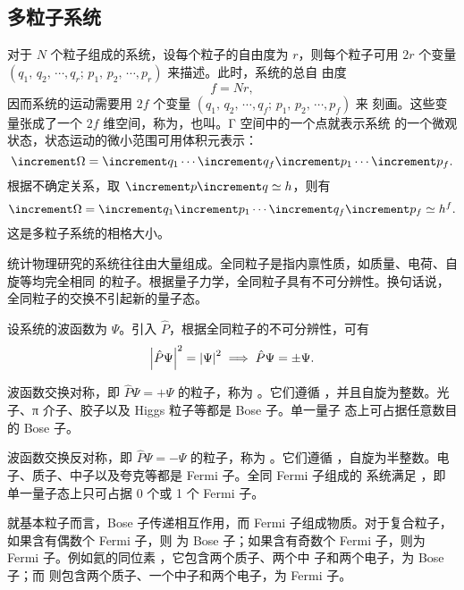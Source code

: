\subsection{多粒子系统}

对于 $N$ 个粒子组成的系统，设每个粒子的自由度为 $r$，则每个粒子可用 $2r$ 个变量
$(q_1, \, q_2, \, \cdots, q_r; \, \allowbreak p_1, \, p_2, \, \cdots, p_r)$ 来描述。此时，系统的总自
由度
\begin{equation}
  f = Nr,
\end{equation}
因而系统的运动需要用 $2f$ 个变量 $(q_1, \, q_2, \, \cdots, q_f; \, p_1, \, p_2, \, \cdots, p_f)$ 来
刻画。这些变量张成了一个 $2f$ 维空间，称为，也叫。Γ 空间中的一个点就表示系统
的一个微观状态，状态运动的微小范围可用体积元表示：
\begin{equation}
  \incr{\Omega} = \incr{q_1} \cdots \incr{q_f} \incr{p_1} \cdots \incr{p_f}.
\end{equation}
根据不确定关系，取 $\incr{p} \incr{q} \simeq h$，则有
\begin{equation}
  \incr{\Omega} = \incr{q_1} \incr{p_1} \cdots \incr{q_f} \incr{p_f} \simeq h^f.
\end{equation}
这是多粒子系统的相格大小。

统计物理研究的系统往往由大量组成。全同粒子是指内禀性质，如质量、电荷、自旋等均完全相同
的粒子。根据量子力学，全同粒子具有不可分辨性。换句话说，全同粒子的交换不引起新的量子态。

设系统的波函数为 $\Psi$。引入 $\hat{P}$，根据全同粒子的不可分辨性，可有
\begin{equation}
  \abs{\hat{P}\Psi}^2 = \abs{\Psi}^2 \implies \hat{P}\Psi = \pm\Psi.
\end{equation}

波函数交换对称，即 $\hat{P}\Psi=+\Psi$ 的粒子，称为 。它们遵循
，并且自旋为整数。光子、π 介子、胶子以及 Higgs 粒子等都是 Bose 子。单一量子
态上可占据任意数目的 Bose 子。

波函数交换反对称，即 $\hat{P}\Psi=-\Psi$ 的粒子，称为 。它们遵循
，自旋为半整数。电子、质子、中子以及夸克等都是 Fermi 子。全同 Fermi 子组成的
系统满足 ，即单一量子态上只可占据 0 个或 1 个 Fermi 子。

就基本粒子而言，Bose 子传递相互作用，而 Fermi 子组成物质。对于复合粒子，如果含有偶数个 Fermi 子，则
为 Bose 子；如果含有奇数个 Fermi 子，则为 Fermi 子。例如氦的同位素 ，它包含两个质子、两个中
子和两个电子，为 Bose 子；而  则包含两个质子、一个中子和两个电子，为 Fermi 子。

